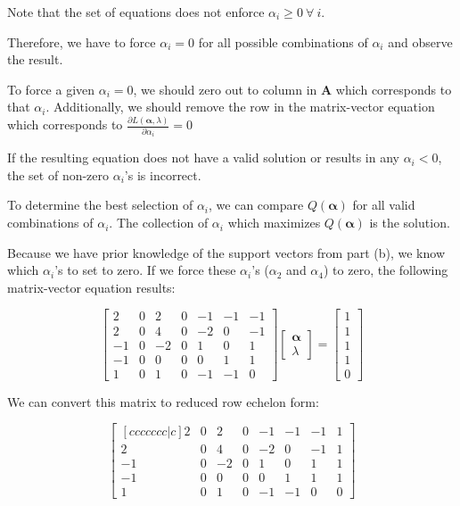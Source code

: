 \documentclass[fleqn]{article}
\begin{document}
\begin{enumerate}
\begin{enumerate}
		Note that the set of equations does not enforce $\alpha_i \geq 0\ \forall\ i$.
		
		Therefore, we have to force $\alpha_i = 0$ for all possible combinations of $\alpha_i$ and observe the result.
		
		To force a given $\alpha_i = 0$, we should zero out to column in $\mathbf{A}$ which corresponds to that $\alpha_i$. Additionally, we should remove the row in the matrix-vector equation which corresponds to $\frac{\partial{L(\boldsymbol{\alpha},\lambda)}}{\partial\alpha_i} = 0$
		
		 If the resulting equation does not have a valid solution or results in any $\alpha_i < 0$, the set of non-zero $\alpha_i$'s is incorrect.
		 
		 To determine the best selection of $\alpha_i$, we can compare $Q(\boldsymbol{\alpha})$ for all valid combinations of $\alpha_i$. The collection of $\alpha_i$ which maximizes $Q(\boldsymbol{\alpha})$ is the solution.
		
		Because we have prior knowledge of the support vectors from part (b), we know which $\alpha_i$'s to set to zero. If we force these $\alpha_i$'s ($\alpha_2$ and $\alpha_4$) to zero, the following matrix-vector equation results:
		
		\begin{equation*}
			\begin{bmatrix}
				 2 & 0 &  2 & 0 & -1 & -1 & -1 \\
             	 2 & 0 &  4 & 0 & -2 &  0 & -1 \\
            		-1 & 0 & -2 & 0 &  1 &  0 &  1 \\
               	-1 & 0 &  0 & 0 &  0 &  1 &  1 \\
                	 1 & 0 &  1 & 0 & -1 & -1 &  0
			\end{bmatrix}\begin{bmatrix}
				\boldsymbol{\alpha} \\ \lambda
			\end{bmatrix} = \begin{bmatrix}
				1 \\ 1 \\ 1 \\ 1 \\ 0
			\end{bmatrix}
		\end{equation*}
		
		We can convert this matrix to reduced row echelon form:
		
		\begin{equation*}
			\begin{bmatrix}[ccccccc|c]
				 2 & 0 &  2 & 0 & -1 & -1 & -1 & 1\\
             	 2 & 0 &  4 & 0 & -2 &  0 & -1 & 1\\
            		-1 & 0 & -2 & 0 &  1 &  0 &  1 & 1\\
               	-1 & 0 &  0 & 0 &  0 &  1 &  1 & 1\\
                	 1 & 0 &  1 & 0 & -1 & -1 &  0 & 0
			\end{bmatrix}
		\end{equation*}
		

\end{enumerate}
\end{enumerate}
\end{document}
